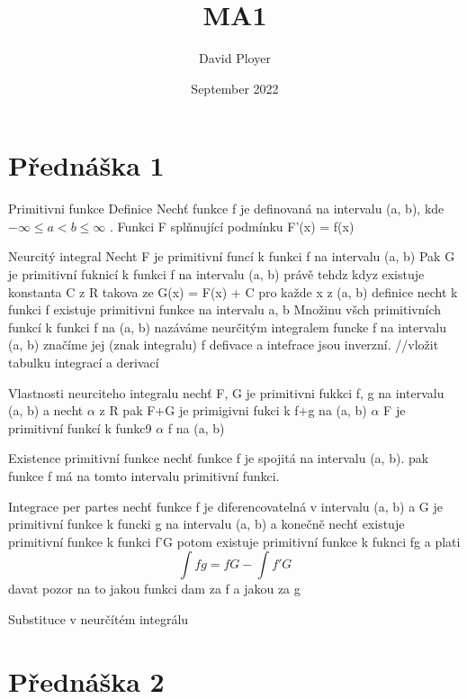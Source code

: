 \documentclass{article}
\title{MA1}
\author{David Ployer}
\date{September 2022}
\begin{document}
\maketitle
\section{Přednáška 1}
Primitivni funkce 
	Definice 
		Nechť funkce f je definovaná na intervalu (a, b), kde $-\infty \leq a < b \leq \infty$ . Funkci F splňnující podmínku 
		F'(x) = f(x)

Neurcitý integral 
	Necht F je primitivní funcí k funkci f na intervalu (a, b) Pak G je primitivní fuknicí k funkci f na intervalu (a, b) právě tehdz kdyz existuje konstanta C z R takova ze 
	G(x) = F(x) + C pro každe x z (a, b)
	definice 
		necht k funkci f existuje primitivni funkce na intervalu a, b Množinu všch primitivních funkcí k funkci f na (a, b) nazáváme neurčitým integralem funcke f na intervalu (a, b) značíme jej (znak integralu) f
	defivace a intefrace jsou inverzní.
	//vložit tabulku integrací a derivací

Vlastnosti neurciteho integralu
	nechť F, G je primitivni fukkci f, g na intervalu (a, b) a necht $\alpha$ z R pak 
		F+G je primigivni fukci k f+g na (a, b)
		$\alpha$ F je primitivní funkcí k funkc9 $\alpha$ f na (a, b)
	
Existence primitivní funkce
	nechť funkce f je spojitá na intervalu (a, b). pak funkce f má na tomto intervalu primitivní funkci.

Integrace per partes 
	nechť funkce f je diferencovatelná v intervalu (a, b) a G je primitivní funkce k funcki g na intervalu (a, b) a konečně nechť existuje primitivní funkce k funkci f'G potom existuje primitivní funkce k fuknci fg a plati
$$\int fg = fG - \int f'G$$
	davat pozor na to jakou funkci dam za f a jakou za g

Substituce v neurčítém integrálu

\section{Přednáška 2}
\end{document}
